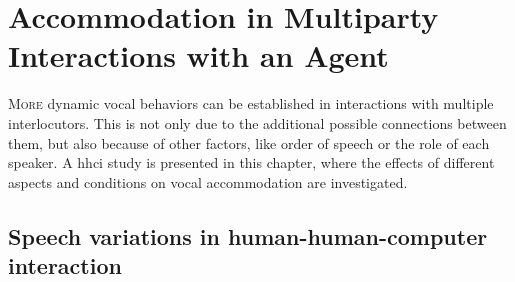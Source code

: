 \chapter{Accommodation in Multiparty Interactions with an Agent}
\label{chap:speech_variations_in_hhci}

\lettrine{M}{ore} dynamic vocal behaviors can be established in interactions with multiple interlocutors.
This is not only due to the additional possible connections between them, but also because of other factors, like order of speech or the role of each speaker.
A \acl{hhci} study is presented in this chapter, where the effects of different aspects and conditions on vocal accommodation are investigated.

\pagebreak

\acresetall

\section{Speech variations in human-human-computer interaction}
\label{sec:accommodation_in_multiparty_interaction_with_an_agent}


